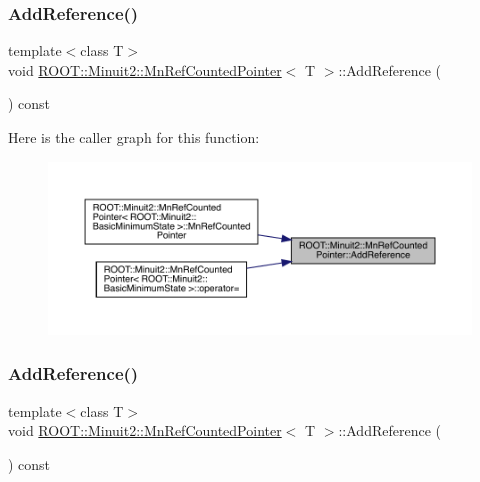 \subsubsection{\texorpdfstring{AddReference()}{AddReference()}\hspace{0.1cm}{\footnotesize\ttfamily [1/3]}}
{\footnotesize\ttfamily template$<$class T$>$ \\
void \mbox{\hyperlink{classROOT_1_1Minuit2_1_1MnRefCountedPointer}{R\+O\+O\+T\+::\+Minuit2\+::\+Mn\+Ref\+Counted\+Pointer}}$<$ T $>$\+::Add\+Reference (\begin{DoxyParamCaption}{ }\end{DoxyParamCaption}) const\hspace{0.3cm}{\ttfamily [inline]}}

Here is the caller graph for this function\+:
\nopagebreak
\begin{figure}[H]
\begin{center}
\leavevmode
\includegraphics[width=350pt]{d5/d13/classROOT_1_1Minuit2_1_1MnRefCountedPointer_a9a8d01a9009e9a9b272c14e46cbeb4d5_icgraph}
\end{center}
\end{figure}
\mbox{\label{classROOT_1_1Minuit2_1_1MnRefCountedPointer_a9a8d01a9009e9a9b272c14e46cbeb4d5}} 
\subsubsection{\texorpdfstring{AddReference()}{AddReference()}\hspace{0.1cm}{\footnotesize\ttfamily [2/3]}}
{\footnotesize\ttfamily template$<$class T$>$ \\
void \mbox{\hyperlink{classROOT_1_1Minuit2_1_1MnRefCountedPointer}{R\+O\+O\+T\+::\+Minuit2\+::\+Mn\+Ref\+Counted\+Pointer}}$<$ T $>$\+::Add\+Reference (\begin{DoxyParamCaption}{ }\end{DoxyParamCaption}) const\hspace{0.3cm}{\ttfamily [inline]}}

